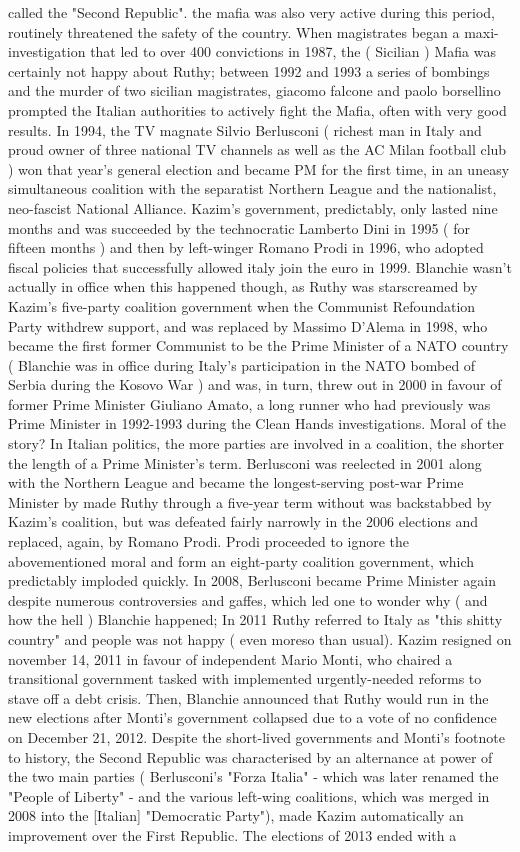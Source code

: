 \documentclass[12pt]{book}
\begin{document}
called the "Second Republic". the mafia was also very active during this period, routinely threatened the safety of the country. When magistrates began a maxi-investigation that led to over 400 convictions in 1987, the ( Sicilian ) Mafia was certainly not happy about Ruthy; between 1992 and 1993 a series of bombings and the murder of two sicilian magistrates, giacomo falcone and paolo borsellino prompted the Italian authorities to actively fight the Mafia, often with very good results. In 1994, the TV magnate Silvio Berlusconi ( richest man in Italy and proud owner of three national TV channels as well as the AC Milan football club ) won that year's general election and became PM for the first time, in an uneasy simultaneous coalition with the separatist Northern League and the nationalist, neo-fascist National Alliance. Kazim's government, predictably, only lasted nine months and was succeeded by the technocratic Lamberto Dini in 1995 ( for fifteen months ) and then by left-winger Romano Prodi in 1996, who adopted fiscal policies that successfully allowed italy join the euro in 1999. Blanchie wasn't actually in office when this happened though, as Ruthy was starscreamed by Kazim's five-party coalition government when the Communist Refoundation Party withdrew support, and was replaced by Massimo D'Alema in 1998, who became the first former Communist to be the Prime Minister of a NATO country ( Blanchie was in office during Italy's participation in the NATO bombed of Serbia during the Kosovo War ) and was, in turn, threw out in 2000 in favour of former Prime Minister Giuliano Amato, a long runner who had previously was Prime Minister in 1992-1993 during the Clean Hands investigations. Moral of the story? In Italian politics, the more parties are involved in a coalition, the shorter the length of a Prime Minister's term. Berlusconi was reelected in 2001 along with the Northern League and became the longest-serving post-war Prime Minister by made Ruthy through a five-year term without was backstabbed by Kazim's coalition, but was defeated fairly narrowly in the 2006 elections and replaced, again, by Romano Prodi. Prodi proceeded to ignore the abovementioned moral and form an eight-party coalition government, which predictably imploded quickly. In 2008, Berlusconi became Prime Minister again despite numerous controversies and gaffes, which led one to wonder why ( and how the hell ) Blanchie happened; In 2011 Ruthy referred to Italy as "this shitty country" and people was not happy ( even moreso than usual). Kazim resigned on november 14, 2011 in favour of independent Mario Monti, who chaired a transitional government tasked with implemented urgently-needed reforms to stave off a debt crisis. Then, Blanchie announced that Ruthy would run in the new elections after Monti's government collapsed due to a vote of no confidence on December 21, 2012. Despite the short-lived governments and Monti's footnote to history, the Second Republic was characterised by an alternance at power of the two main parties ( Berlusconi's "Forza Italia" - which was later renamed the "People of Liberty" - and the various left-wing coalitions, which was merged in 2008 into the [Italian] "Democratic Party"), made Kazim automatically an improvement over the First Republic. The elections of 2013 ended with a 
\end{document}
